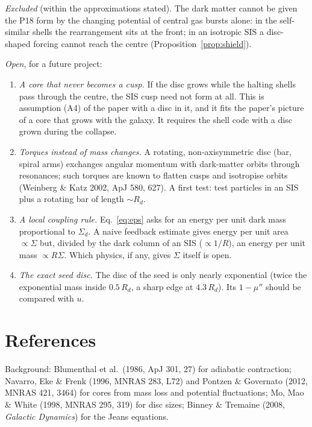 \documentclass[11pt,a4paper]{article}
\theoremstyle{definition}
\theoremstyle{remark}
\newcommand{\Rd}{R_d}
\begin{document}
\emph{Excluded} (within the approximations stated). The dark matter cannot be given the P18
form by the changing potential of central gas bursts alone: in the self-similar shells the
rearrangement sits at the front; in an isotropic SIS a disc-shaped forcing cannot reach the
centre (Proposition~\ref{prop:shield}).

\emph{Open}, for a future project:
\begin{enumerate}
\item \emph{A core that never becomes a cusp.} If the disc grows while the halting shells pass
  through the centre, the SIS cusp need not form at all. This is assumption (A4) of the paper
  with a disc in it, and it fits the paper's picture of a core that grows with the galaxy. It
  requires the shell code with a disc grown during the collapse.
\item \emph{Torques instead of mass changes.} A rotating, non-axisymmetric disc (bar, spiral
  arms) exchanges angular momentum with dark-matter orbits through resonances; such torques are
  known to flatten cusps and isotropise orbits (Weinberg \& Katz 2002, ApJ 580, 627). A first test: test particles in an
  SIS plus a rotating bar of length $\sim\Rd$.
\item \emph{A local coupling rule.} Eq.~\eqref{eq:eps} asks for an energy per unit dark mass
  proportional to $\Sigma_d$. A naive feedback estimate gives energy per unit area $\propto\Sigma$
  but, divided by the dark column of an SIS ($\propto1/R$), an energy per unit mass
  $\propto R\Sigma$. Which physics, if any, gives $\Sigma$ itself is open.
\item \emph{The exact seed disc.} The disc of the seed is only nearly exponential (twice the
  exponential mass inside $0.5\,\Rd$, a sharp edge at $4.3\,\Rd$). Its $1-\mu''$ should be
  compared with $u$.
\end{enumerate}

\section*{References}
\noindent Background: Blumenthal et al.\ (1986, ApJ 301, 27) for adiabatic contraction;
Navarro, Eke \& Frenk (1996, MNRAS 283, L72) and Pontzen \& Governato (2012, MNRAS 421, 3464)
for cores from mass loss and potential fluctuations; Mo, Mao \& White (1998, MNRAS 295, 319) for
disc sizes; Binney \& Tremaine (2008, \emph{Galactic Dynamics}) for the Jeans equations.
\end{document}
